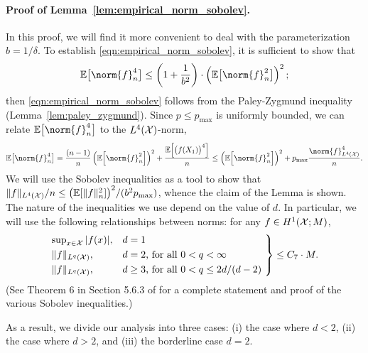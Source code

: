 \paragraph{Proof of Lemma~\ref{lem:empirical_norm_sobolev}.}
In this proof, we will find it more convenient to deal with the parameterization $b = 1/\delta$. To establish \eqref{eqn:empirical_norm_sobolev}, it is sufficient to show that
\begin{equation*}
\mathbb{E}\bigl[\norm{f}_n^4\bigr] \leq \left(1 + \frac{1}{b^2}\right)\cdot \left(\mathbb{E}\bigl[\norm{f}_n^2\bigr]\right)^2;
\end{equation*}
then \eqref{eqn:empirical_norm_sobolev} follows from the Paley-Zygmund inequality (Lemma~\ref{lem:paley_zygmund}). Since $p \leq p_{\max}$ is uniformly bounded, we can relate $\mathbb{E}\bigl[\norm{f}_n^4\bigr]$ to the $L^4(\mathcal{X})$-norm,
\begin{equation*}
\mathbb{E}\bigl[\norm{f}_n^4\bigr] = \frac{(n-1)}{n}\left(\mathbb{E}\Bigl[\norm{f}_n^2\Bigr]\right)^2 + \frac{\mathbb{E}\Bigl[\bigl(f(X_1)\bigr)^4\Bigr]}{n} \leq \left(\mathbb{E}\Bigl[\norm{f}_n^2\Bigr]\right)^2 + p_{\max}\frac{\norm{f}_{\Leb^4(\Xset)}^4}{n}.
\end{equation*}
We will use the Sobolev inequalities as a tool to show that $\|f\|_{L^4(\mathcal{X})}/n \leq \bigl(\mathbb{E}[\|f\|_n^2]\bigr)^2/(b^2p_{\max})$, whence the claim of the Lemma is shown. The nature of the inequalities we use depend on the value of $d$. In particular, we will use the following relationships between norms: for any $f \in H^1(\mathcal{X};M)$, 
\begin{equation*}
\begin{rcases*}
\sup_{x \in \mc{X}}|f(x)|,& \textrm{$d = 1$}\\
\|f\|_{\Leb^{q}(\mc{X})},& \textrm{$d = 2$, for all $0 < q < \infty$} \\
\|f\|_{\Leb^{q}(\mc{X})},& \textrm{$d \geq 3$, for all $0 < q \leq 2d/(d - 2)$}
\end{rcases*}
\leq C_7 \cdot M.
\end{equation*}
(See Theorem 6 in Section 5.6.3 of \citet{evans10} for a complete statement and proof of the various Sobolev inequalities.)

As a result, we divide our analysis into three cases: (i) the case where $d < 2$, (ii) the case where $d > 2$, and (iii) the borderline case $d = 2$.

